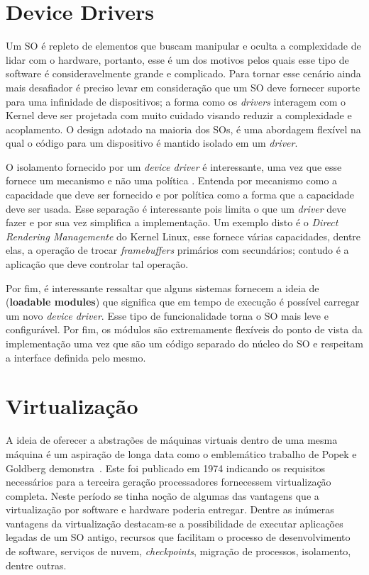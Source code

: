 \section{Device Drivers}
\label{sec:dd}

Um SO é repleto de elementos que buscam manipular e oculta a complexidade de
lidar com o hardware, portanto, esse é um dos motivos pelos quais esse tipo de
software é consideravelmente grande e complicado. Para tornar esse cenário
ainda mais desafiador é preciso levar em consideração que um SO deve fornecer
suporte para uma infinidade de dispositivos; a forma como os \emph{drivers}
interagem com o Kernel deve ser projetada com muito cuidado visando reduzir a
complexidade e acoplamento.  O design adotado na maioria dos SOs, é uma
abordagem flexível na qual o código para um dispositivo é mantido isolado em um
\emph{driver}.

O isolamento fornecido por um \emph{device driver} é interessante, uma vez que
esse fornece um mecanismo e não uma política \citep{ddbook}. Entenda por
mecanismo como a capacidade que deve ser fornecido e por política como a forma
que a capacidade deve ser usada. Esse separação é interessante pois limita o
que um \emph{driver} deve fazer e por sua vez simplifica a implementação. Um
exemplo disto é o \emph{Direct Rendering Managemente} do Kernel Linux, esse
fornece várias capacidades, dentre elas, a operação de trocar
\emph{framebuffers} primários com secundários; contudo é a aplicação que deve
controlar tal operação.

Por fim, é interessante ressaltar que alguns sistemas fornecem a ideia de
 (\textbf{loadable modules}) que significa
que em tempo de execução é possível carregar um novo \emph{device driver}. Esse
tipo de funcionalidade torna o SO mais leve e configurável. Por fim, os módulos
são extremamente flexíveis do ponto de vista da implementação uma vez que são
um código separado do núcleo do SO e respeitam a interface definida pelo mesmo.

\section{Virtualização}
\label{sec:virtualizacao}


A ideia de oferecer a abstrações de máquinas virtuais dentro de uma mesma
máquina é um aspiração de longa data como o emblemático trabalho de Popek e
Goldberg demonstra~\citep{popek}. Este foi publicado em 1974 indicando os
requisitos necessários para a terceira geração processadores fornecessem
virtualização completa. Neste período se tinha noção de algumas das vantagens
que a virtualização por software e hardware poderia entregar. Dentre as
inúmeras vantagens da virtualização destacam-se a possibilidade de executar
aplicações legadas de um SO antigo, recursos que facilitam o processo de
desenvolvimento de software, serviços de nuvem, \emph{checkpoints}, migração de
processos, isolamento, dentre outras.

